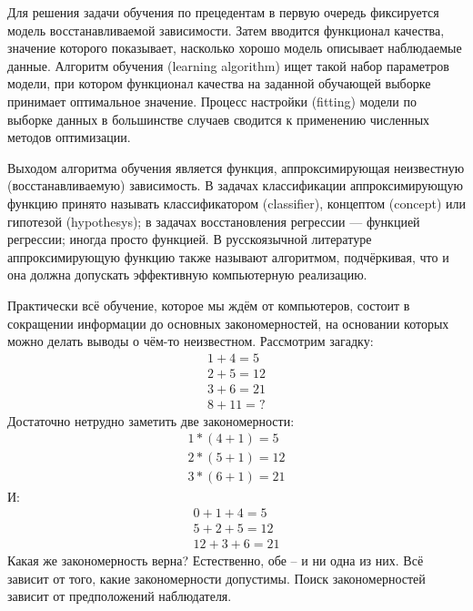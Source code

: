 \documentclass[a4paper, 12pt]{article}
\begin{document}
	Для решения задачи обучения по прецедентам в первую очередь фиксируется модель восстанавливаемой зависимости. Затем вводится функционал качества, значение которого показывает, насколько хорошо модель описывает наблюдаемые данные. Алгоритм обучения (learning algorithm) ищет такой набор параметров модели, при котором функционал качества на заданной обучающей выборке принимает оптимальное значение. Процесс настройки (fitting) модели по выборке данных в большинстве случаев сводится к применению численных методов оптимизации.
	
	Выходом алгоритма обучения является функция, аппроксимирующая неизвестную (восстанавливаемую) зависимость. В задачах классификации аппроксимирующую функцию принято называть классификатором (classifier), концептом (concept) или гипотезой (hypothesys); в задачах восстановления регрессии — функцией регрессии; иногда просто функцией. В русскоязычной литературе аппроксимирующую функцию также называют алгоритмом, подчёркивая, что и она должна допускать эффективную компьютерную реализацию.
	
	Практически всё обучение, которое мы ждём от компьютеров, состоит в сокращении информации до основных закономерностей, на основании которых можно делать выводы о чём-то неизвестном. Рассмотрим загадку:
	\begin{equation*}
		\begin{gathered}
			1 + 4 = 5\\
			2 + 5 = 12\\
			3 + 6 = 21\\
			8 + 11 =?
		\end{gathered}
	\end{equation*}
	Достаточно нетрудно заметить две закономерности:
	\begin{equation*}
		\begin{gathered}
			1 * (4 + 1) = 5\\
			2 * (5 + 1) = 12\\
			3 * (6 + 1) = 21
		\end{gathered}
	\end{equation*}
	И:
	\begin{equation*}
		\begin{gathered}
			0 + 1 + 4 = 5\\
			5 + 2 + 5 = 12\\
			12 + 3 + 6 = 21
		\end{gathered}
	\end{equation*}
	Какая же закономерность верна? Естественно, обе – и ни одна из них. Всё зависит от того, какие закономерности допустимы. Поиск закономерностей зависит от предположений наблюдателя.
	
\end{document}
